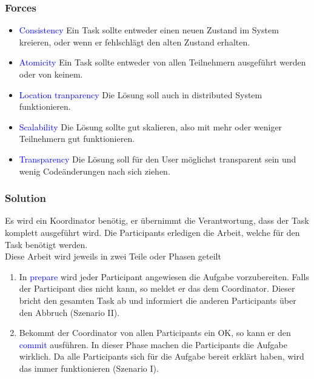 \subsubsection{Forces}

\begin{itemize}
    \item \textcolor{blue}{Consistency} Ein Task sollte entweder einen neuen Zustand im System kreieren, oder wenn er fehlschlägt den alten Zustand erhalten.
    \item \textcolor{blue}{Atomicity} Ein Task sollte entweder von allen Teilnehmern ausgeführt werden oder von keinem.
    \item \textcolor{blue}{Location tranparency} Die Lösung soll auch in distributed System funktionieren.
    \item \textcolor{blue}{Scalability} Die Lösung sollte gut skalieren, also mit mehr oder weniger Teilnehmern gut funktionieren.
    \item \textcolor{blue}{Transparency} Die Lösung soll für den User möglichst transparent sein und wenig Codeänderungen nach sich ziehen.
\end{itemize}

\subsubsection{Solution}

Es wird ein Koordinator benötig, er übernimmt die Verantwortung, dass der Task komplett ausgeführt wird. Die Participants erledigen die Arbeit, welche für den Task benötigt werden. \\

Diese Arbeit wird jeweils in zwei Teile oder Phasen geteilt

\begin{enumerate}
    \item In \textcolor{blue}{prepare} wird jeder Participant angewiesen die Aufgabe vorzubereiten. Falls der Participant dies nicht kann, so meldet er das dem Coordinator. Dieser bricht den gesamten Task ab und informiert die anderen Participants über den Abbruch (Szenario II).
    \item Bekommt der Coordinator von allen Participants ein OK, so kann er den \textcolor{blue}{commit} ausführen. In dieser Phase machen die Participants die Aufgabe wirklich. Da alle Participants sich für die Aufgabe bereit erklärt haben, wird das immer funktionieren (Szenario I).
\end{enumerate}

